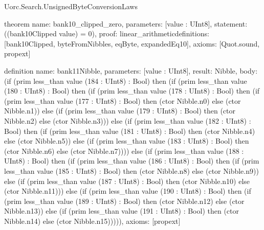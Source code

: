 \begin{lexlean}{Uorc.Search.UnsignedByteConversionLaws}
\begin{semanticmodule}
theorem{
  name: bank10_clipped_zero,
  parameters: [value : UInt8],
  statement: ((bank10Clipped value) = 0),
  proof: linear_arithmetic{definitions: [bank10Clipped, byteFromNibbles, eqByte, expandedEq10]},
  axioms: [Quot.sound, propext]
}

definition{
  name: bank11Nibble,
  parameters: [value : UInt8],
  result: Nibble,
  body: (if (prim less_than value (184 : UInt8) : Bool) then (if (prim less_than value (180 : UInt8) : Bool) then (if (prim less_than value (178 : UInt8) : Bool) then (if (prim less_than value (177 : UInt8) : Bool) then (ctor Nibble.n0) else (ctor Nibble.n1)) else (if (prim less_than value (179 : UInt8) : Bool) then (ctor Nibble.n2) else (ctor Nibble.n3))) else (if (prim less_than value (182 : UInt8) : Bool) then (if (prim less_than value (181 : UInt8) : Bool) then (ctor Nibble.n4) else (ctor Nibble.n5)) else (if (prim less_than value (183 : UInt8) : Bool) then (ctor Nibble.n6) else (ctor Nibble.n7)))) else (if (prim less_than value (188 : UInt8) : Bool) then (if (prim less_than value (186 : UInt8) : Bool) then (if (prim less_than value (185 : UInt8) : Bool) then (ctor Nibble.n8) else (ctor Nibble.n9)) else (if (prim less_than value (187 : UInt8) : Bool) then (ctor Nibble.n10) else (ctor Nibble.n11))) else (if (prim less_than value (190 : UInt8) : Bool) then (if (prim less_than value (189 : UInt8) : Bool) then (ctor Nibble.n12) else (ctor Nibble.n13)) else (if (prim less_than value (191 : UInt8) : Bool) then (ctor Nibble.n14) else (ctor Nibble.n15))))),
  axioms: [propext]
}


\end{semanticmodule}
\end{lexlean}

